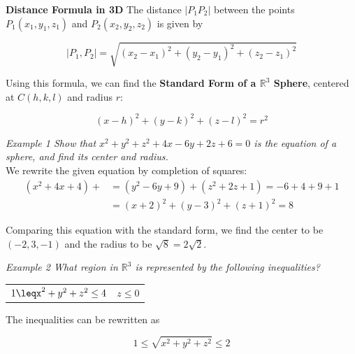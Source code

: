 \documentclass{article}
\begin{document}
            \noindent \color{purple} \textbf{Distance Formula in 3D} \color{black} The distance
            $|P_1P_2|$ between the points $P_1(x_1,y_1,z_1)$ and $P_2(x_2,y_2,z_2)$ is given by

            \begin{equation*}
                |P_1, P_2|=\sqrt{(x_2-x_1)^2+(y_2-y_1)^2+(z_2-z_1)^2}
            \end{equation*}

            \noindent Using this formula, we can find the \color{purple} \textbf{Standard Form of
            a $\mathbb{R}^3$ Sphere}\color{black}, centered at $C(h,k,l)$ and radius $r$:

            \begin{equation*}
                (x-h)^2+(y-k)^2+(z-l)^2=r^2
            \end{equation*}

            \noindent \color{blue} \textit{Example 1 Show that $x^2+y^2+z^2+4x-6y+2z+6=0$ is the
            equation of a sphere, and find its center and radius.}\color{black}\\

            \noindent We rewrite the given equation by completion of squares:
            \begin{align*}
                (x^2+4x+4)+ &= (y^2-6y+9)+(z^2+2z+1)=-6+4+9+1\\
                &= (x+2)^2+(y-3)^2+(z+1)^2=8
            \end{align*}

            \noindent Comparing this equation with the standard form, we find the center to be
            $(-2,3,-1)$ and the radius to be $\sqrt{8}=2\sqrt{2}.$

            \noindent \color{blue} \textit{Example 2 What region in $\mathbb{R}^3$ is represented
            by the following inequalities?}

            \begin{center}
                \begin{tabular}{cc}
                    $1\leqx^2+y^2+z^2\leq4$
                    & $z\leq0$
                \end{tabular}
            \end{center}
            \color{black}

            \noindent The inequalities can be rewritten as

            \begin{equation*}
                1\leq\sqrt{x^2+y^2+z^2}\leq2
            \end{equation*}
\end{document}
